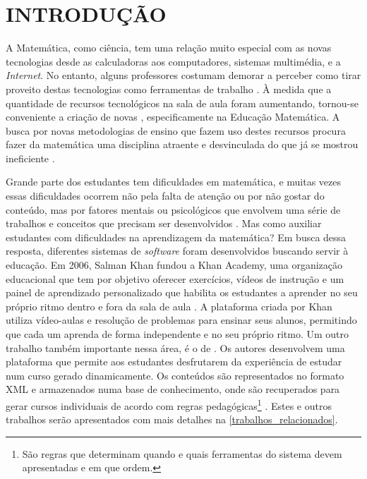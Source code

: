 \section{INTRODUÇÃO}

A Matemática, como ciência, tem uma relação muito especial com as novas tecnologias desde as calculadoras aos computadores, sistemas multimédia, e a \textit{Internet}. No entanto, 
alguns professores costumam 
demorar a perceber como tirar proveito destas tecnologias como ferramentas de trabalho \cite{da1997ensino}. \`A medida que a quantidade de recursos tecnológicos na sala de aula foram aumentando, 
tornou-se conveniente a criação de novas , especificamente na Educação Matemática. A 
busca por novas metodologias de ensino que fazem uso destes recursos procura fazer da matemática uma disciplina atraente e desvinculada do  que já se mostrou ineficiente 
\cite{silva2009ambiente}.

Grande parte dos estudantes tem dificuldades em  matemática, e muitas vezes essas dificuldades ocorrem não pela falta de atenção ou por não gostar do conteúdo, mas por fatores mentais 
ou psicológicos que envolvem uma série de trabalhos e conceitos que precisam ser desenvolvidos \cite{sa2015software}. Mas como auxiliar estudantes com dificuldades na aprendizagem da matemática? Em 
busca dessa resposta, diferentes sistemas de \textit{software} foram desenvolvidos buscando servir \`a  educação. Em 2006, Salman Khan fundou a Khan Academy, uma organização educacional que tem 
por objetivo oferecer exercícios, vídeos de instrução e um painel de aprendizado personalizado que habilita os estudantes a aprender no seu próprio ritmo dentro e fora da sala de aula 
\cite{khan2012one}. A plataforma criada por Khan utiliza vídeo-aulas e resolução de problemas para ensinar seus alunos, permitindo que cada um aprenda de forma independente e no seu pr\'oprio ritmo. Um outro trabalho também  importante nessa área, \'e o de  . Os autores desenvolvem uma plataforma que permite aos estudantes desfrutarem da experiência de estudar num curso gerado dinamicamente. Os conte\'udos s\~ao representados no formato XML \cite{bray1998extensible} e armazenados numa base de conhecimento, onde s\~ao recuperados para gerar cursos individuais de acordo com regras pedagógicas\footnote{S\~ao regras que determinam quando e quais ferramentas do sistema devem apresentadas e em que ordem.} \cite{melis2004activemath}. Estes e outros trabalhos serão 
apresentados com mais detalhes na \autoref{trabalhos_relacionados}.

